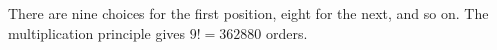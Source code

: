 There are nine choices for the first position, eight for the next, and so on. The multiplication principle gives $9!=\boxed{362880}$ orders.
